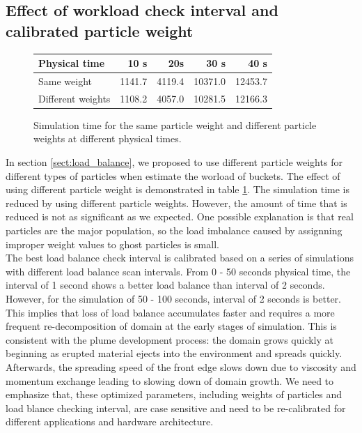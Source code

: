 \documentclass[procedia]{easychair}
\begin{document}
\subsection{Effect of workload check interval and calibrated particle weight}
\begin{figure}
\CenterFloatBoxes
\ttabbox
{	  
	  \begin{tabular}{lrrrr}
	    \hline
	    Physical time & 10 s & 20s & 30 s & 40 s \\
	    \hline
	    Same weight & 1141.7 & 4119.4 & 10371.0 & 12453.7\\
	    Different weights & 1108.2 & 4057.0 & 10281.5 & 12166.3\\
	    \hline
	  \end{tabular}
}
{\caption{Simulation time for the same particle weight and different particle weights at different physical times.}}
\label{tab:same_diff_particle_weight}
\end{figure}
In section \ref{sect:load_balance}, we proposed to use different particle weights for different types of particles when estimate the worload of buckets. The effect of using different particle weight is demonstrated in table \ref{tab:same_diff_particle_weight}. The simulation time is reduced by using different particle weights. However, the amount of time that is reduced is not as significant as we expected. One possible explanation is that real particles are the major population, so the load imbalance caused by assignning improper weight values to ghost particles is small.\\
The best load balance check interval is calibrated based on a series of simulations with different load balance scan intervals. From 0 - 50 seconds physical time, the interval of 1 second shows a better load balance than interval of 2 seconds. However, for the simulation of 50 - 100 seconds, interval of 2 seconds is better. This implies that loss of load balance accumulates faster and requires a more frequent re-decomposition of domain at the early stages of simulation. This is consistent with the plume development process: the domain grows quickly at beginning as erupted material ejects into the environment and spreads quickly. Afterwards, the spreading speed of the front edge slows down due to viscosity and momentum exchange leading to slowing down of domain growth. We need to emphasize that, these optimized parameters, including weights of particles and load blance checking interval, are case sensitive and need to be re-calibrated for different applications and hardware architecture.
%
\end{document}
